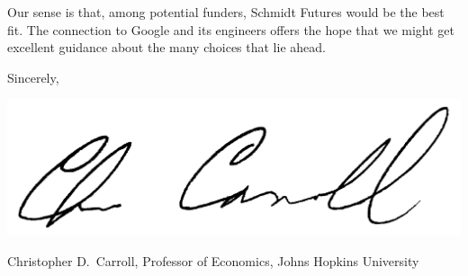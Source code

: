 \documentclass[11pt,pdftex,letterpaper]{article}
\begin{document}
Our sense is that, among potential funders, Schmidt Futures would be the best fit. The connection to Google and its engineers offers the hope that we might get excellent guidance about the many choices that lie ahead.

\vspace{0.5cm}

{\parskip=2pt Sincerely,

  \includegraphics[scale=0.7]{CDCsignature.jpg}
  
Christopher D.\ Carroll, Professor of Economics, Johns Hopkins University}
\end{document}
